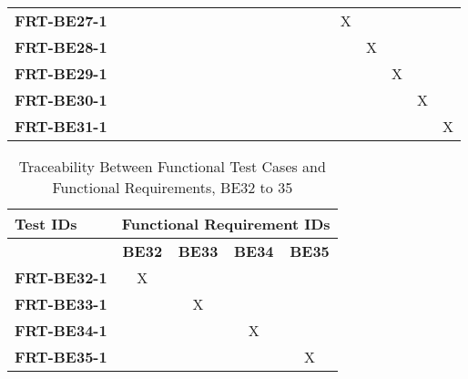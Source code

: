\documentclass[12pt, titlepage]{article}
\begin{document}
\begin{landscape}
\begin{longtable}{|l|ccccccccccccccc|}
		\textbf{FRT-BE27-1} & ~                                                         & ~             & ~             & ~             & ~             & ~             & ~             & ~             & ~             & ~             & X             & ~             & ~             & ~             & ~             \\
		\textbf{FRT-BE28-1} & ~                                                         & ~             & ~             & ~             & ~             & ~             & ~             & ~             & ~             & ~             & ~             & X             & ~             & ~             & ~             \\
		\textbf{FRT-BE29-1} & ~                                                         & ~             & ~             & ~             & ~             & ~             & ~             & ~             & ~             & ~             & ~             & ~             & X             & ~             & ~             \\
		\textbf{FRT-BE30-1} & ~                                                         & ~             & ~             & ~             & ~             & ~             & ~             & ~             & ~             & ~             & ~             & ~             & ~             & X             & ~             \\
		\textbf{FRT-BE31-1} & ~                                                         & ~             & ~             & ~             & ~             & ~             & ~             & ~             & ~             & ~             & ~             & ~             & ~             & ~             & X             \\
		\hline
	\end{longtable}

	\newpage

	\begin{longtable}{|l|cccc|}
		\caption{Traceability Between Functional Test Cases and Functional Requirements, BE32 to 35}                                   \\
		\hline
		\textbf{Test IDs}   & \multicolumn{4}{c|}{\textbf{Functional Requirement IDs}}                                                 \\
		\hline
		~                   & \textbf{BE32}                                            & \textbf{BE33} & \textbf{BE34} & \textbf{BE35} \\
		\hline
		\textbf{FRT-BE32-1} & X                                                        & ~             & ~             & ~             \\
		\textbf{FRT-BE33-1} & ~                                                        & X             & ~             & ~             \\
		\textbf{FRT-BE34-1} & ~                                                        & ~             & X             & ~             \\
		\textbf{FRT-BE35-1} & ~                                                        & ~             & ~             & X             \\
		\hline
	\end{longtable}


\end{landscape}
\end{document}
